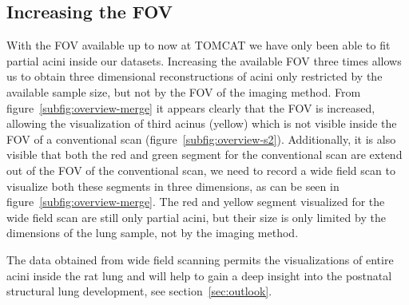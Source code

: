 \subsection{Increasing the FOV}
\cbstart
With the FOV available up to now at TOMCAT we have only been able to fit partial acini inside our datasets. Increasing the available FOV three times allows us to obtain three dimensional reconstructions of acini only restricted by the available sample size, but not by the FOV of the imaging method. From figure~\ref{subfig:overview-merge} it appears clearly that the FOV is increased, allowing the visualization of third acinus (yellow) which is not visible inside the FOV of a conventional scan (figure~\ref{subfig:overview-s2}). Additionally, it is also visible that both the red and green segment for the conventional scan are extend out of the FOV of the conventional scan, we need to record a wide field scan to visualize both these segments in three dimensions, as can be seen in figure~\ref{subfig:overview-merge}. The red and yellow segment visualized for the wide field scan are still only partial acini, but their size is only limited by the dimensions of the lung sample, not by the imaging method.

The data obtained from wide field scanning permits the visualizations of entire acini inside the rat lung and will help to gain a deep insight into the postnatal structural lung development, see section~\ref{sec:outlook}.
\cbend

